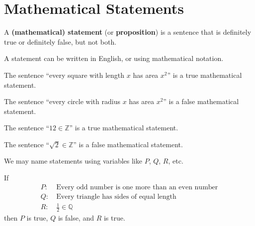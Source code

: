 \section{Mathematical Statements}
\begin{definition}
    A \textbf{(mathematical) statement} (or \textbf{proposition}) is a sentence that is definitely true or definitely false, but not both.
\end{definition}
\begin{remark}
    A statement can be written in English, or using mathematical notation.
\end{remark}
\begin{example}
    The sentence ``every square with length $x$ has area $x^2$'' is a true mathematical statement.
\end{example}
\begin{example}
    The sentence ``every circle with radius $x$ has area $x^2$'' is a false mathematical statement.
\end{example}
\begin{example}
    The sentence ``$12 \in \mathbb{Z}$'' is a true mathematical statement.
\end{example}
\begin{example}
    The sentence ``$\sqrt2 \in \mathbb{Z}$'' is a false mathematical statement.
\end{example}

We may name statements using variables like $P$, $Q$, $R$, etc.
\begin{example}
    If
    \begin{align*}
        P: &\ \text{Every odd number is one more than an even number}\\
        Q: &\ \text{Every triangle has sides of equal length}\\
        R: &\ \frac12 \in \mathbb{Q}
    \end{align*}
    then $P$ is true, $Q$ is false, and $R$ is true.
\end{example}

